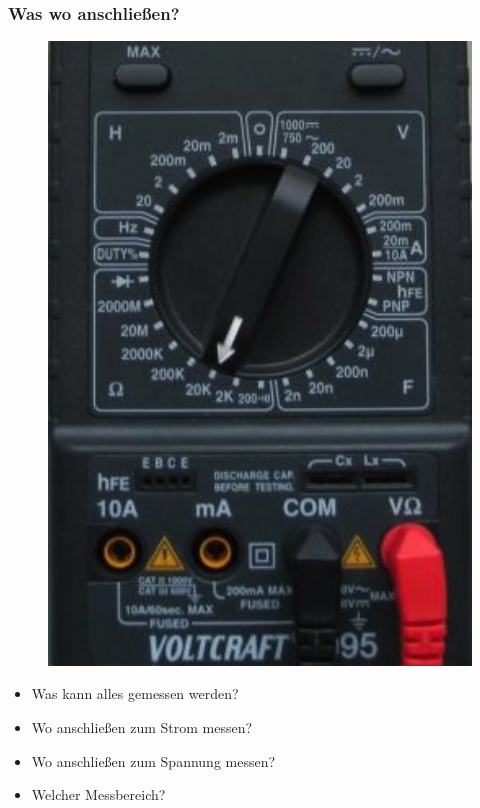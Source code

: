 \begin{frame}
  \frametitle{Was wo anschließen?}
  \begin{minipage}{0.4\textwidth}
    \begin{figure}
      \includegraphics[width=1\textwidth,height=.75\textheight,keepaspectratio]{e17/digitalmultimeterMess.jpg}
    \end{figure}
  \end{minipage}
  \begin{minipage}{0.55\textwidth}
    \begin{itemize}
      \item Was kann alles gemessen werden?
      \item Wo anschließen zum Strom messen?
      \item Wo anschließen zum Spannung messen?
      \item Welcher Messbereich?
    \end{itemize}
  \end{minipage}
\end{frame}


